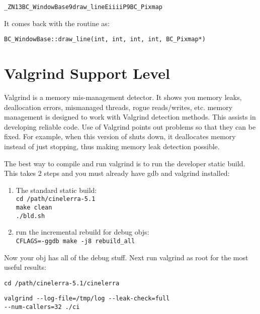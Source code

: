 \hspace{2em}\texttt{\_ZN13BC\_WindowBase9draw\_lineEiiiiP9BC\_Pixmap}

It comes back with the routine as:

\hspace{2em}\texttt{BC\_WindowBase::draw\_line(int, int, int, int, BC\_Pixmap*)}

\section{Valgrind Support Level}
\label{sec:valgrind_support_level}

Valgrind is a memory mis-management detector.  It shows you memory leaks, deallocation errors, mismanaged threads, rogue reads/writes, etc.  \CGG{} memory management is designed to work with Valgrind detection methods.  This assists in developing reliable code.  Use of Valgrind points out problems so that they can be fixed.  For example, when this version of \CGG{} shuts down, it deallocates memory instead of just stopping, thus making memory leak detection possible.

The best way to compile and run valgrind is to run the developer static build. This takes 2 steps and you must already have gdb and valgrind installed:

\begin{enumerate}[nosep]
	\item The standard static build:\\
		\texttt{cd /path/cinelerra-5.1}\\
		\texttt{make clean}\\
		\texttt{./bld.sh}
	\item run the incremental rebuild for debug objs:\\
		\texttt{CFLAGS=-ggdb make -j8 rebuild\_all}
\end{enumerate}

Now your \CGG{} obj has all of the debug stuff. Next run valgrind as root for the most useful results:

\hspace{2em}\texttt{cd /path/cinelerra-5.1/cinelerra}

\hspace{2em}\texttt{valgrind -{}-log-file=/tmp/log -{}-leak-check=full\\
	-{}-num-callers=32 ./ci}

